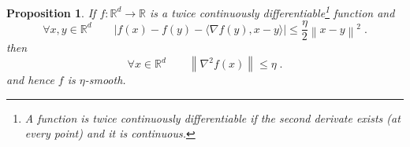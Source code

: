 \documentclass[12pt]{article}
\newtheorem{proposition}[definition]{Proposition}
\newcommand{\R}{\mathbb{R}}
\newcommand{\grad}{\nabla}
\newcommand{\norm}[1]{\left\|#1\right\|}
\begin{document}
\begin{proposition}
If $f:\R^d \to \R$ is a twice continuously differentiable\footnote{A function is twice continuously differentiable if the second derivate exists (at every point) and it is continuous.}
function and
\begin{equation}
\label{equation:smoothness-proposition-2}
\forall x,y \in \R^d \qquad \left| f(x) - f(y) - \langle \grad f(y), x - y \rangle \right| \le \frac{\eta}{2} \norm{x - y}^2 \; .
\end{equation}
then
\begin{equation}
\label{equation:smoothness-proposition-3}
\forall x \in \R^d \qquad \norm{\grad^2 f(x)} \le \eta \; .
\end{equation}
and hence $f$ is $\eta$-smooth.
\end{proposition}
\end{document}
